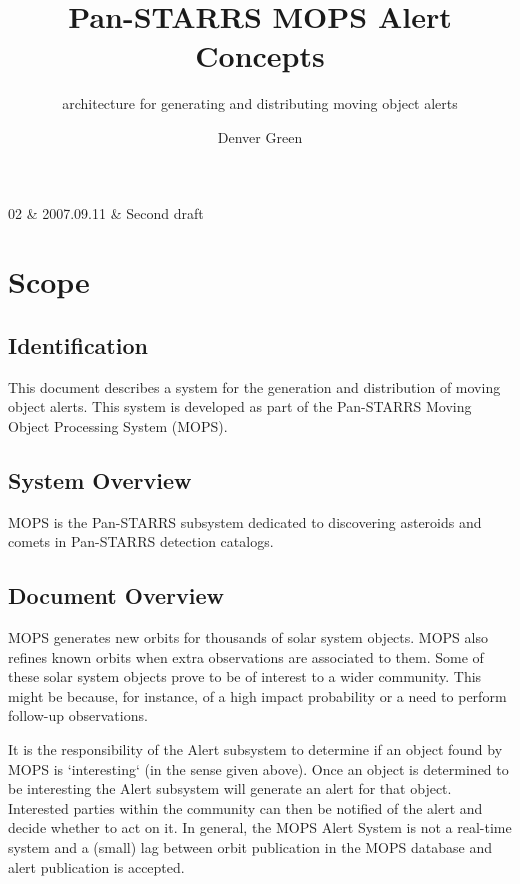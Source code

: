 \documentclass[panstarrs]{panstarrs}
\title{Pan-STARRS MOPS Alert Concepts}
\subtitle{architecture for generating and distributing moving object alerts}
\author{Denver Green}
\begin{document}
\maketitle

\RevisionsStart
02        & 2007.09.11 & Second draft \\
\hline
\RevisionsEnd

\TBDsStart
\TBDsEnd

\pagebreak
\tableofcontents

\pagebreak
\listoffigures

\pagebreak 
{}
\section{Scope}
\subsection{Identification}
This document describes a system for the generation and distribution of moving 
object alerts. This system is developed as part of the Pan-STARRS Moving Object 
Processing System (MOPS).

\subsection{System Overview}
MOPS is the Pan-STARRS subsystem dedicated to discovering
asteroids and comets in Pan-STARRS detection catalogs.

\subsection{Document Overview}
MOPS generates new orbits for thousands of solar system objects. MOPS also refines known orbits when extra observations are associated to them. Some of these solar system objects prove to be of interest to a wider community. This might be because, for instance, of a high impact probability or a need to perform follow-up observations.

It is the responsibility of the Alert subsystem to determine if an object found by MOPS is `interesting` (in the sense given above). Once an object is determined to be interesting the Alert subsystem will generate an alert for that object. Interested parties within the community can then be notified of the alert and decide whether to act on it. In general, the MOPS Alert System is not a real-time system and a (small) lag between orbit publication in the MOPS database and alert publication is accepted.
\end{document}
